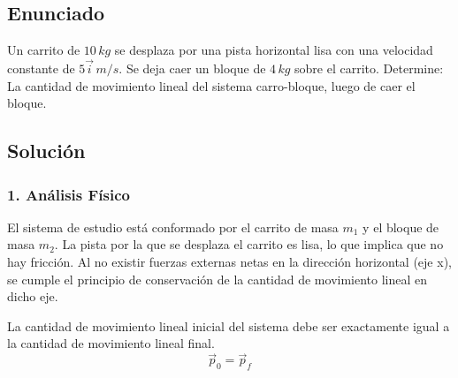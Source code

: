 \documentclass[12pt, a4paper]{article}
\begin{document}
\subsection*{Enunciado}
Un carrito de $10 \, \si{kg}$ se desplaza por una pista horizontal lisa con una velocidad constante de $5 \vec{i} \, \si{m/s}$. Se deja caer un bloque de $4 \, \si{kg}$ sobre el carrito. Determine: La cantidad de movimiento lineal del sistema carro-bloque, luego de caer el bloque.

\begin{center}
\end{center}

\subsection*{Solución}

\subsubsection*{1. Análisis Físico}
El sistema de estudio está conformado por el carrito de masa $m_1$ y el bloque de masa $m_2$. La pista por la que se desplaza el carrito es lisa, lo que implica que no hay fricción. Al no existir fuerzas externas netas en la dirección horizontal (eje x), se cumple el principio de conservación de la cantidad de movimiento lineal en dicho eje.

La cantidad de movimiento lineal inicial del sistema debe ser exactamente igual a la cantidad de movimiento lineal final.
\[ \vec{p}_0 = \vec{p}_f \]
\end{document}
